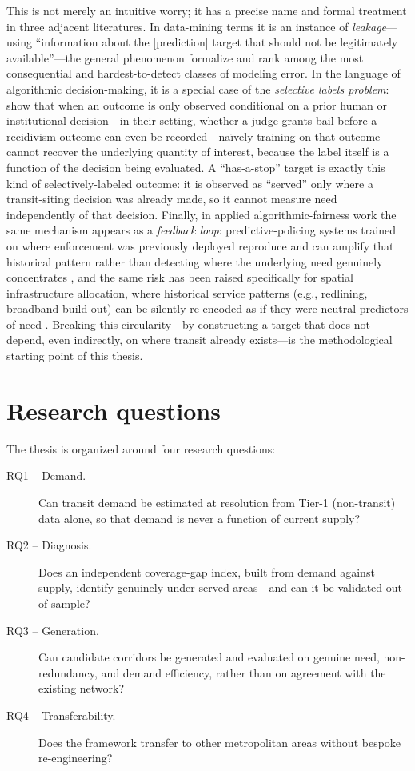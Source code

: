 This is not merely an intuitive worry; it has a precise name and formal treatment in three
adjacent literatures. In data-mining terms it is an instance of \emph{leakage}---using
``information about the [prediction] target that should not be legitimately
available''---the general phenomenon \textcite{kaufman2012leakage} formalize and rank among
the most consequential and hardest-to-detect classes of modeling error. In the language of
algorithmic decision-making, it is a special case of the \emph{selective labels problem}:
\textcite{lakkaraju2017selectivelabels} show that when an outcome is only observed
conditional on a prior human or institutional decision---in their setting, whether a judge
grants bail before a recidivism outcome can even be recorded---na\"ively training on that
outcome cannot recover the underlying quantity of interest, because the label itself is a
function of the decision being evaluated. A ``has-a-stop'' target is exactly this kind of
selectively-labeled outcome: it is observed as ``served'' only where a transit-siting
decision was already made, so it cannot measure need independently of that decision.
Finally, in applied algorithmic-fairness work the same mechanism appears as a
\emph{feedback loop}: predictive-policing systems trained on where enforcement was
previously deployed reproduce and can amplify that historical pattern rather than
detecting where the underlying need genuinely concentrates
\parencite{lum2016predict, ensign2018runaway}, and the same risk has been raised
specifically for spatial infrastructure allocation, where historical service patterns
(e.g., redlining, broadband build-out) can be silently re-encoded as if they were neutral
predictors of need \parencite{flynn2022spacetime}. Breaking this circularity---by
constructing a target that does not depend, even indirectly, on where transit already
exists---is the methodological starting point of this thesis.

\section{Research questions}
\label{sec:intro-rqs}

The thesis is organized around four research questions:

\begin{description}
  \item[RQ1 -- Demand.] Can transit demand be estimated at \ageb resolution from
    Tier-1 (non-transit) data alone, so that demand is never a function of current
    supply?
  \item[RQ2 -- Diagnosis.] Does an independent coverage-gap index, built from demand
    against supply, identify genuinely under-served areas---and can it be validated
    out-of-sample?
  \item[RQ3 -- Generation.] Can candidate corridors be generated and evaluated on
    genuine need, non-redundancy, and demand efficiency, rather than on agreement with
    the existing network?
  \item[RQ4 -- Transferability.] Does the framework transfer to other metropolitan
    areas without bespoke re-engineering?
\end{description}

